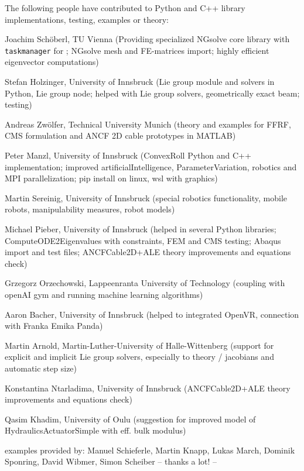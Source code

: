 The following people have contributed to Python and C++ library implementations, testing, examples or theory:
\bi
  \item Joachim Sch{\"o}berl, TU Vienna (Providing specialized NGsolve \cite{Schoeberl1997,NGsolve2014,NGsolve2022} core library with \texttt{taskmanager} for ; NGsolve mesh and FE-matrices import; highly efficient eigenvector computations)
  \item Stefan Holzinger, University of Innsbruck (Lie group module and solvers in Python, Lie group node; helped with Lie group solvers, geometrically exact beam; testing)
  \item Andreas Zw{\"o}lfer, Technical University Munich (theory and examples for FFRF, CMS formulation and ANCF 2D cable prototypes in MATLAB)
  \item Peter Manzl, University of Innsbruck (ConvexRoll Python and C++ implementation; improved artificialIntelligence, ParameterVariation, robotics and MPI parallelization; pip install on linux, wsl with graphics)
  \item Martin Sereinig, University of Innsbruck (special robotics functionality, mobile robots, manipulability measures, robot models)
  \item Michael Pieber, University of Innsbruck (helped in several Python libraries; ComputeODE2Eigenvalues with constraints, FEM and CMS testing; Abaqus import and test files; ANCFCable2D+ALE theory improvements and equations check)
  \item Grzegorz Orzechowski, Lappeenranta University of Technology (coupling with openAI gym and running machine learning algorithms)
  \item Aaron Bacher, University of Innsbruck (helped to integrated OpenVR, connection with Franka Emika Panda)
  \item Martin Arnold, Martin-Luther-University of Halle-Wittenberg (support for explicit and implicit Lie group solvers, especially to theory / jacobians and automatic step size)
  \item Konstantina Ntarladima, University of Innsbruck (ANCFCable2D+ALE theory improvements and equations check)
  \item Qasim Khadim, University of Oulu (suggestion for improved model of HydraulicsActuatorSimple with eff. bulk modulus)
  \item examples provided by: Manuel Schieferle, Martin Knapp, Lukas March, Dominik Sponring, David Wibmer, Simon Scheiber
\ei
-- thanks a lot! --
%
\newpage
{}
%

